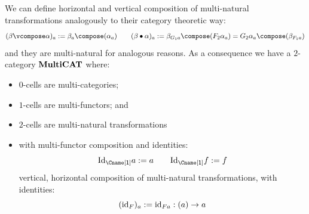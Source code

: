 We can define horizontal and vertical composition of multi-natural
transformations analogously to their category theoretic way:
\[
(\beta\vcompose\alpha)_a := \beta_a \compose (\alpha_a) \qquad
(\beta\hcompose\alpha)_a := \beta_{G_1a}\compose (F_2\alpha_a)
                          =G_2\alpha_a\compose (\beta_{F_1a})
\]
and they are multi-natural for analogous reasons. As a consequence we
have a $2$-category $\MultiCAT$ where:
\begin{itemize}
\item $0$-cells are multi-categories;
\item $1$-cells are multi-functors; and
\item $2$-cells are multi-natural transformations
\item with multi-functor composition and identities:
  \[
  \Id[{\CC}] a := a \qquad \Id[{\CC}]f := f
  \]
  vertical, horizontal composition of multi-natural transformations,
  with identities:
  \[
  (\id[{F}])_a := \id[{Fa}] : (a) \to a
  \]

\end{itemize}

